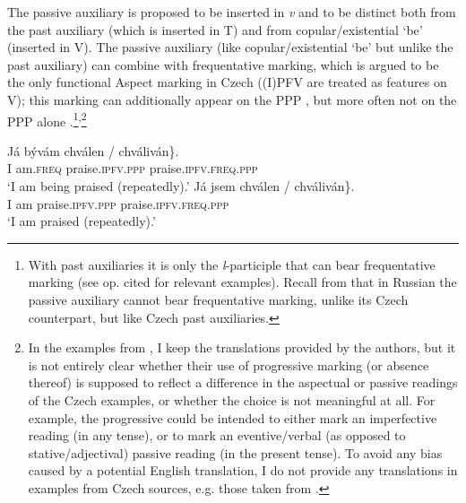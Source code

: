 \documentclass[output=paper,colorlinks,citecolor=brown]{langscibook}
\begin{document}
The passive auxiliary is proposed to be inserted in \textit{v} and to be distinct both from the past auxiliary (which is inserted in T) and from copular/existential `be' (inserted in V). The passive auxiliary (like copular/existential `be' but unlike the past auxiliary) can combine with frequentative marking, which is argued to be the only functional Aspect marking in Czech ((I)PFV are treated as features on V); this marking can additionally appear on the PPP  \citep[adapted from][174]{veselovskakarlik}, but more often not on the PPP alone  \citep[adapted from][188]{veselovskakarlik}.\footnote{With past auxiliaries it is only the \textit{l}-participle that can bear frequentative marking (see op. cited for relevant examples). Recall from  that in Russian the passive auxiliary cannot bear frequentative marking, unlike its Czech counterpart, but like Czech past auxiliaries.}\textsuperscript{,}\footnote{In the examples from \citet{veselovskakarlik}, I keep the translations provided by the authors, but it is not entirely clear whether their use of progressive marking (or absence thereof) is supposed to reflect a difference in the aspectual or passive readings of the Czech examples, or whether the choice is not meaningful at all. For example, the progressive could be intended to either mark an imperfective reading (in any tense), or to mark an eventive/verbal (as opposed to stative/adjectival) passive reading (in the present tense). To avoid any bias caused by a potential English translation, I do not provide any translations in examples from Czech sources, e.g. those taken from \citet{karlik17}.} 

\ea \label{ex:PPPfreqa}
\ea 
\gll Já bývám \minsp{\{} chválen / chváliván\}. \\
 I am.\textsc{freq} {} praise.\textsc{ipfv.ppp} {} praise.\textsc{ipfv.freq.ppp} \\
\glt `I am being praised (repeatedly).'
\ex 
\gll Já jsem \minsp{\{} chválen / chváliván\}. \\
 I am {} praise.\textsc{ipfv.ppp} {} praise.\textsc{ipfv.freq.ppp} \\
\glt `I am praised (repeatedly).'
\z
\z

\ea \label{ex:PPPfreqb}
\z
\z 
\end{document}
